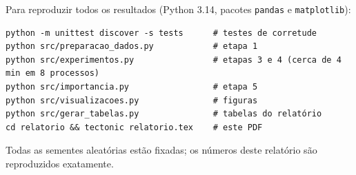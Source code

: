 \documentclass[11pt,a4paper]{article}
\begin{document}
Para reproduzir todos os resultados (Python 3.14, pacotes \texttt{pandas} e \texttt{matplotlib}):
\begin{lstlisting}
python -m unittest discover -s tests      # testes de corretude
python src/preparacao_dados.py            # etapa 1
python src/experimentos.py                # etapas 3 e 4 (cerca de 4 min em 8 processos)
python src/importancia.py                 # etapa 5
python src/visualizacoes.py               # figuras
python src/gerar_tabelas.py               # tabelas do relatório
cd relatorio && tectonic relatorio.tex    # este PDF
\end{lstlisting}
Todas as sementes aleatórias estão fixadas; os números deste relatório são reproduzidos exatamente.
\end{document}
